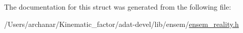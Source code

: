 The documentation for this struct was generated from the following file\+:\begin{DoxyCompactItemize}
\item 
/\+Users/archanar/\+Kinematic\+\_\+factor/adat-\/devel/lib/ensem/\mbox{\hyperlink{adat-devel_2lib_2ensem_2ensem__reality_8h}{ensem\+\_\+reality.\+h}}\end{DoxyCompactItemize}
